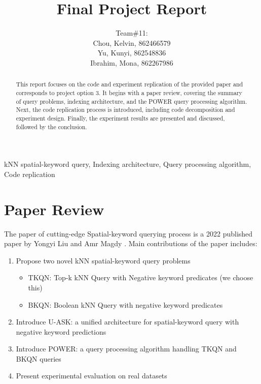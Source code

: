 \documentclass[]{IEEEphot}
\begin{document}
\title{Final Project Report}

\author{Team\#11:\\
    Chou, Kelvin, 862466579\\
    Yu, Kunyi, 862548836\\
    Ibrahim, Mona, 862267986}

\maketitle


\begin{abstract}
    This report focuses on the code and experiment replication of the provided paper \cite{ref1-original-paper} and corresponds to project option 3. It begins with a paper review, covering the summary of query problems, indexing architecture, and the POWER query processing algorithm. Next, the code replication process is introduced, including code decomposition and experiment design. Finally, the experiment results are presented and discussed, followed by the conclusion.
\end{abstract}

\begin{IEEEkeywords}
    kNN spatial-keyword query, Indexing architecture, Query processing algorithm, Code replication
\end{IEEEkeywords}

\section{Paper Review}

The paper of cutting-edge Spatial-keyword querying process is a 2022 published paper by Yongyi Liu and Amr Magdy \cite{ref1-original-paper}. Main contributions of the paper includes:

\begin{enumerate}
    \item Propose two novel kNN spatial-keyword query problems
          \begin{itemize}
              \item TKQN: Top-k kNN Query with Negative keyword predicates (we choose this)
              \item BKQN: Boolean kNN Query with negative keyword predicates
          \end{itemize}
    \item Introduce U-ASK: a unified architecture for spatial-keyword query with negative keyword predictions
    \item Introduce POWER: a query processing algorithm handling TKQN and BKQN queries
    \item Present experimental evaluation on real datasets
\end{enumerate}
\end{document}
